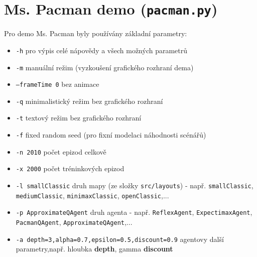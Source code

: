 \section{Ms. Pacman demo (\texttt{pacman.py})}
\label{priloha:manualp}
Pro demo Ms. Pacman byly používány základní parametry:
\begin{itemize}
\item \texttt{-h} pro výpis celé nápovědy a všech možných parametrů
\item \texttt{-m} manuální režim (vyzkoušení grafického rozhraní dema)
\item \texttt{--frameTime 0} bez animace
\item \texttt{-q} minimalistický režim bez grafického rozhraní
\item \texttt{-t} textový režim bez grafického rozhraní 
\item \texttt{-f} fixed random seed (pro fixní modelaci náhodnosti scénářů)
\item \texttt{-n 2010} počet epizod celkově
\item \texttt{-x 2000} počet tréninkových epizod
\item \texttt{-l smallClassic} druh mapy (ze složky \texttt{src/layouts}) - např. \texttt{smallClassic}, \newline \texttt{mediumClassic}, \texttt{minimaxClassic}, \texttt{openClassic},...
\item \texttt{-p ApproximateQAgent} druh agenta - např. \texttt{ReflexAgent}, \texttt{ExpectimaxAgent}, \newline \texttt{PacmanQAgent}, \texttt{ApproximateQAgent},...
\item \texttt{-a depth=3,alpha=0.7,epsilon=0.5,discount=0.9} agentovy další parametry,\newline např. hloubka \textbf{depth}, gamma \textbf{discount}
\end{itemize}
